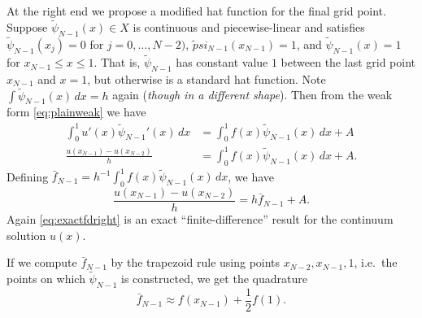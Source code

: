 \documentclass[12pt]{amsart}
\begin{document}
At the right end we propose a modified hat function for the final grid point.  Suppose $\tilde \psi_{N-1}(x) \in X$ is continuous and piecewise-linear and satisfies $\tilde\psi_{N-1}(x_j)=0$ for $j=0,\dots,N-2)$, $\tilde psi_{N-1}(x_{N-1})=1$, and $\tilde \psi_{N-1}(x)=1$ for $x_{N-1} \le x \le 1$.  That is, $\tilde \psi_{N-1}$ has constant value $1$ between the last grid point $x_{N-1}$ and $x=1$, but otherwise is a standard hat function.  Note $\int \tilde \psi_{N-1}(x)\,dx = h$ again (\emph{though in a different shape}).  Then from the weak form \eqref{eq:plainweak} we have
\begin{align*}
\int_0^1 u'(x) \tilde \psi_{N-1}'(x)\,dx &= \int_0^1 f(x) \tilde \psi_{N-1}(x) \,dx + A \\
\frac{u(x_{N-1}) - u(x_{N-2})}{h} &= \int_0^1 f(x) \tilde \psi_{N-1}(x) \,dx + A.
\end{align*}
Defining $\bar f_{N-1} = h^{-1} \int_0^1 f(x) \tilde \psi_{N-1}(x) \,dx$, we have
\begin{equation}
\frac{u(x_{N-1}) - u(x_{N-2})}{h} = h \bar f_{N-1} + A.  \label{eq:exactfdright}
\end{equation}
Again \eqref{eq:exactfdright} is an exact ``finite-difference'' result for the continuum solution $u(x)$.

If we compute $\bar f_{N-1}$ by the trapezoid rule using points $x_{N-2},x_{N-1},1$, i.e.~the points on which $\tilde \psi_{N-1}$ is constructed, we get the quadrature
\begin{equation}
\bar f_{N-1} \approx f(x_{N-1}) + \frac{1}{2} f(1). \label{eq:fquadratureright}
\end{equation}
\end{document}
